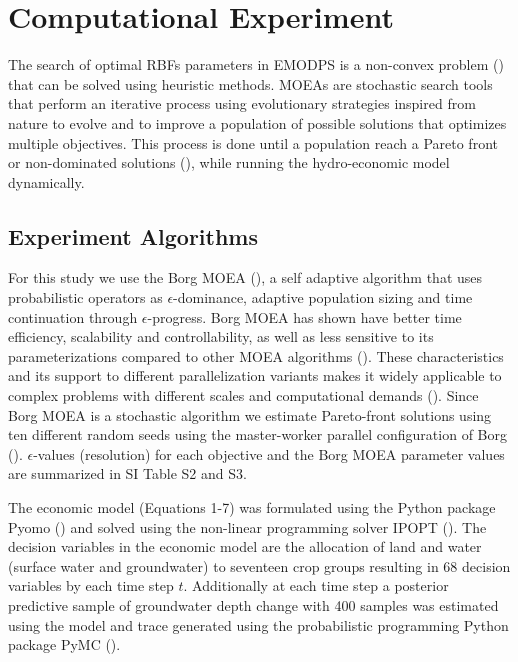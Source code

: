 \documentclass[11pt,a4paper]{article}
\begin{document}
\section{Computational Experiment}

The search of optimal RBFs parameters in EMODPS is a non-convex problem (\cite{giuliani_curses_2016}) that can be solved using heuristic methods. MOEAs are stochastic search tools that perform an iterative process using evolutionary strategies inspired from nature to evolve and to improve a population of possible solutions that optimizes multiple objectives. This process is done until a population reach a Pareto front or non-dominated solutions (\cite{coello_evolutionary_2007}), while running the hydro-economic model dynamically. 

\subsection{Experiment Algorithms}  

For this study we use the Borg MOEA (\cite{hadka_borg_2013}), a self adaptive algorithm that uses probabilistic operators as $\epsilon$-dominance, adaptive population sizing and time continuation through $\epsilon$-progress. Borg MOEA has shown have better time efficiency, scalability and controllability, as well as less sensitive to its parameterizations compared to other MOEA algorithms (\cite{reed_evolutionary_2013}).  These characteristics and its support to different parallelization variants makes it widely applicable to complex problems with different scales and computational demands (\cite{hadka_large-scale_2015}). Since Borg MOEA is a stochastic algorithm we estimate Pareto-front solutions using ten different random seeds using the master-worker parallel configuration of Borg (\cite{hadka_large-scale_2015}). $\epsilon$-values (resolution) for each objective and the Borg MOEA parameter values are summarized in SI Table S2 and S3. 

The economic model (Equations 1-7) was formulated using the Python package Pyomo (\cite{hart_pyomo_2011}) and solved using the non-linear programming solver IPOPT (\cite{wachter_implementation_2006}). The decision variables in the economic model are the allocation of land and water (surface water and groundwater) to seventeen crop groups resulting in 68 decision variables by each time step $t$. Additionally at each time step a posterior predictive sample of groundwater depth change with 400 samples was estimated using the model and trace generated using the probabilistic programming Python package PyMC  (\cite{salvatier_probabilistic_2016}).
\end{document}
